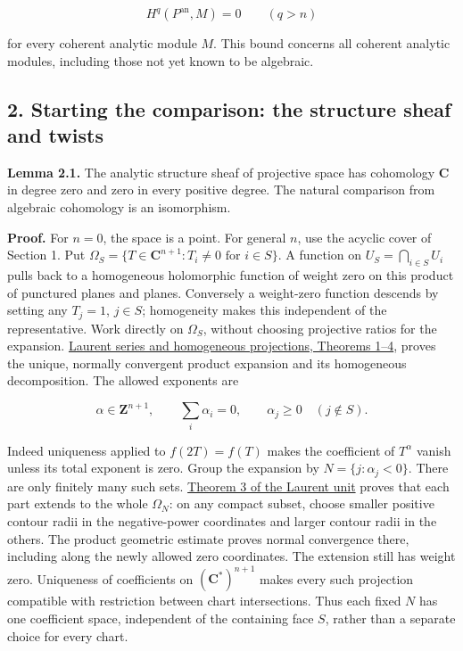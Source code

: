 \documentclass[11pt]{article}
\begin{document}
\[
H^q(P^{\mathrm{an}},M)=0\qquad(q>n)
\tag{1}
\]

for every coherent analytic module \(M\). This bound concerns all
coherent analytic modules, including those not yet known to be
algebraic.

\subsection{2. Starting the comparison: the structure sheaf and
twists}\label{starting-the-comparison-the-structure-sheaf-and-twists}

\textbf{Lemma 2.1.} The analytic structure sheaf of projective space has
cohomology \(\mathbf C\) in degree zero and zero in every positive
degree. The natural comparison from algebraic cohomology is an
isomorphism.

\textbf{Proof.} For \(n=0\), the space is a point. For general \(n\),
use the acyclic cover of Section 1. Put
\(\Omega_S=\{T\in\mathbf C^{n+1}:T_i\ne0\text{ for }i\in S\}\). A
function on \(U_S=\bigcap_{i\in S}U_i\) pulls back to a homogeneous
holomorphic function of weight zero on this product of punctured planes
and planes. Conversely a weight-zero function descends by setting any
\(T_j=1\), \(j\in S\); homogeneity makes this independent of the
representative. Work directly on \(\Omega_S\), without choosing
projective ratios for the expansion.
\href{../../human/elementary-analysis/laurent-series-and-homogeneous-projections.html\#2-products-of-annuli-and-discs}{Laurent
series and homogeneous projections, Theorems 1--4}, proves the unique,
normally convergent product expansion and its homogeneous decomposition.
The allowed exponents are

\[
\alpha\in\mathbf Z^{n+1},\qquad
\sum_i\alpha_i=0,\qquad
\alpha_j\geq0\quad(j\notin S).
\]

Indeed uniqueness applied to \(f(2T)=f(T)\) makes the coefficient of
\(T^\alpha\) vanish unless its total exponent is zero. Group the
expansion by \(N=\{j:\alpha_j<0\}\). There are only finitely many such
sets.
\href{../../human/elementary-analysis/laurent-series-and-homogeneous-projections.html\#3-extending-the-parts-with-specified-negative-powers}{Theorem
3 of the Laurent unit} proves that each part extends to the whole
\(\Omega_N\): on any compact subset, choose smaller positive contour
radii in the negative-power coordinates and larger contour radii in the
others. The product geometric estimate proves normal convergence there,
including along the newly allowed zero coordinates. The extension still
has weight zero. Uniqueness of coefficients on \((\mathbf C^*)^{n+1}\)
makes every such projection compatible with restriction between chart
intersections. Thus each fixed \(N\) has one coefficient space,
independent of the containing face \(S\), rather than a separate choice
for every chart.
\end{document}
